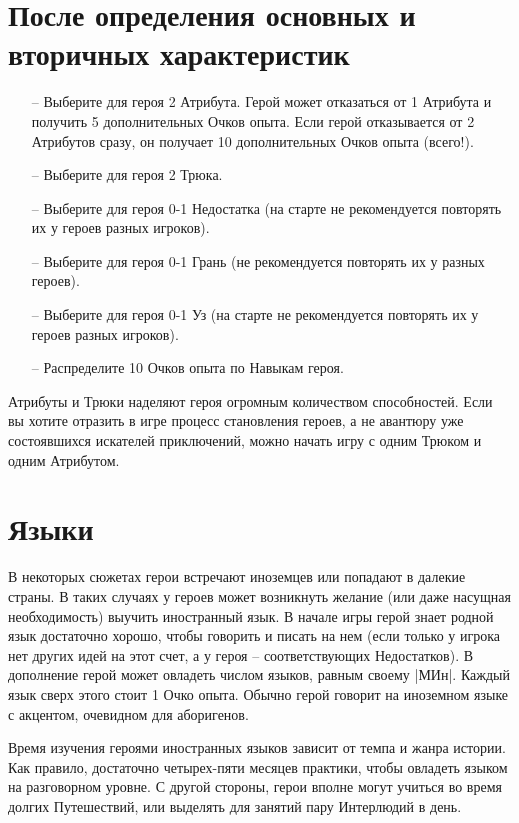 \section{После определения основных и вторичных характеристик}
\begin{itemize}
\item[--] Выберите для героя 2 Атрибута. Герой может отказаться от 1 Атрибута и получить 5 дополнительных Очков опыта. Если герой отказывается от 2 Атрибутов сразу, он получает 10 дополнительных Очков опыта (всего!).
\item[--] Выберите для героя 2 Трюка.
\item[--] Выберите для героя 0-1 Недостатка (на старте не рекомендуется повторять их у героев разных игроков).
\item[--] Выберите для героя 0-1 Грань (не рекомендуется повторять их у разных героев).
\item[--] Выберите для героя 0-1 Уз (на старте не рекомендуется повторять их у героев разных игроков).
\item[--] Распределите 10 Очков опыта по Навыкам героя.
\end{itemize}
\begin{tcolorbox}
Атрибуты и Трюки наделяют героя огромным количеством способностей. Если вы хотите отразить в игре процесс становления героев, а не авантюру уже состоявшихся искателей приключений, можно начать игру с одним Трюком и одним Атрибутом.
\end{tcolorbox}








\section{Языки}
В некоторых сюжетах герои встречают иноземцев или попадают в далекие страны. В таких случаях у героев может возникнуть желание (или даже насущная необходимость) выучить иностранный язык.
\newline В начале игры герой знает родной язык достаточно хорошо, чтобы говорить и писать на нем (если только у игрока нет других идей на этот счет, а у героя – соответствующих Недостатков). В дополнение герой может овладеть числом языков, равным своему |МИн|. Каждый язык сверх этого стоит 1 Очко опыта. Обычно герой говорит на иноземном языке с акцентом, очевидном для аборигенов. 
\begin{tcolorbox}
    Время изучения героями иностранных языков зависит от темпа и жанра истории. Как правило, достаточно четырех-пяти месяцев практики, чтобы овладеть языком на разговорном уровне. С другой стороны, герои вполне могут учиться во время долгих Путешествий, или выделять для занятий пару Интерлюдий в день.
\end{tcolorbox}

